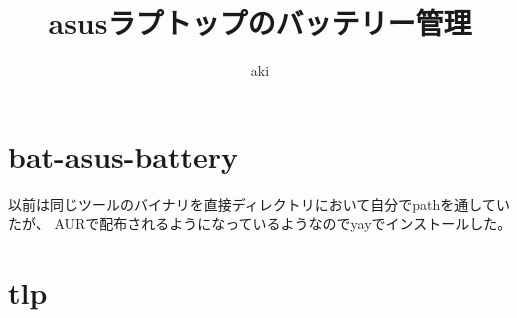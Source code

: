\documentclass[dvipdfmx]{jsarticle}
\begin{document}
\title{asusラプトップのバッテリー管理}
\author{aki}
\thispagestyle{empty}
\maketitle

\section{bat-asus-battery}

以前は同じツールのバイナリを直接ディレクトリにおいて自分でpathを通していたが、
AURで配布されるようになっているようなのでyayでインストールした。

\section{tlp}
\end{document}
